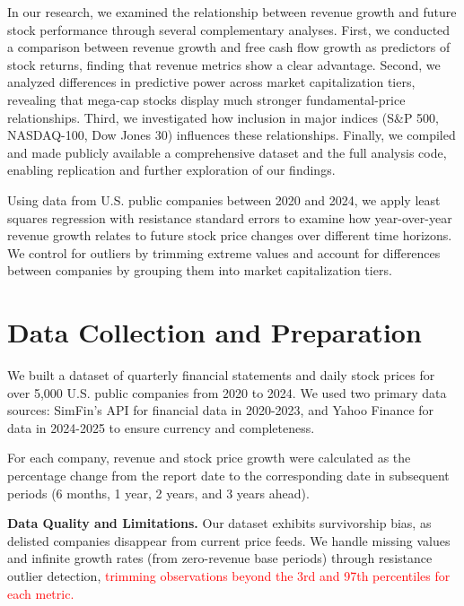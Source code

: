 \documentclass[11pt]{article}
\begin{document}
In our research, we examined the relationship between revenue growth and future stock performance through several complementary analyses. First, we conducted a comparison between revenue growth and free cash flow growth as predictors of stock returns, finding that revenue metrics show a clear advantage. Second, we analyzed differences in predictive power across market capitalization tiers, revealing that mega-cap stocks display much stronger fundamental-price relationships. Third, we investigated how inclusion in major indices (S\&P 500, NASDAQ-100, Dow Jones 30) influences these relationships. Finally, we compiled and made publicly available a comprehensive dataset and the full analysis code, enabling replication and further exploration of our findings.

Using data from U.S. public companies between 2020 and 2024, we apply least squares regression with resistance standard errors to examine how year-over-year revenue growth relates to future stock price changes over different time horizons. We control for outliers by trimming extreme values and account for differences between companies by grouping them into market capitalization tiers.

\section{Data Collection and Preparation}

We built a dataset of quarterly financial statements and daily stock prices for over 5,000 U.S. public companies from 2020 to 2024. We used two primary data sources: SimFin's API \citep{simfin} for financial data in 2020-2023, and Yahoo Finance for data in 2024-2025 to ensure currency and completeness.

For each company, revenue and stock price growth were calculated as the percentage change from the report date to the corresponding date in subsequent periods (6 months, 1 year, 2 years, and 3 years ahead).

\textbf{Data Quality and Limitations.} Our dataset exhibits survivorship bias, as delisted companies disappear from current price feeds. We handle missing values and infinite growth rates (from zero-revenue base periods) through resistance outlier detection, \textcolor{red}{trimming observations beyond the 3rd and 97th percentiles for each metric.}
\end{document}
